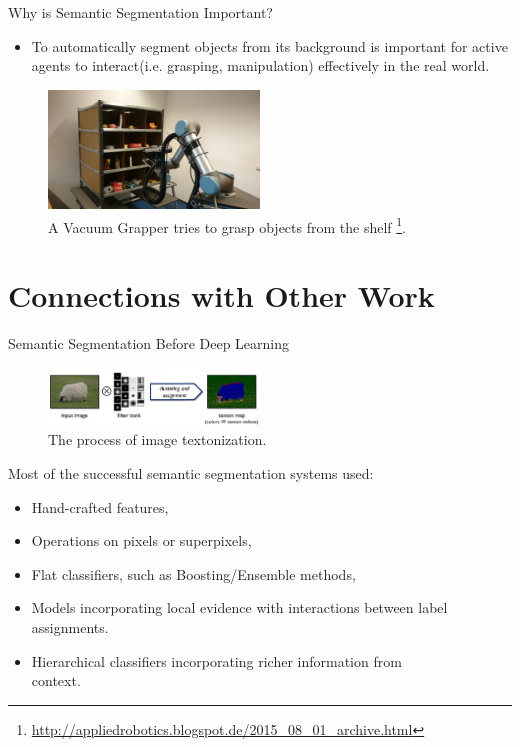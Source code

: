 \documentclass{beamer}
\begin{document}
\begin{frame}{Why is Semantic Segmentation Important?}
\\
\vspace{0.2cm}
\begin{itemize}
	\item
	To automatically segment objects from its background is important for active agents to interact(i.e. grasping, manipulation) effectively in the real world.
\end{itemize}
\begin{figure}
	\centering
	\includegraphics[width=0.5\textwidth]{figure/ss5.jpg}
	\captionsetup{justification=centering}
	\caption{A Vacuum Grapper tries to grasp objects from the shelf \footnote{\url{http://appliedrobotics.blogspot.de/2015\_08\_01\_archive.html}}.}	
\end{figure}

\end{frame}
\section{Connections with Other Work}
\begin{frame}{Semantic Segmentation Before Deep Learning}
\begin{figure}
	\centering
	\includegraphics[width=0.5\textwidth]{figure/ss7.png}
	\captionsetup{justification=centering}
	\caption{The process of image textonization.}	
\end{figure}
	Most of the successful semantic segmentation systems used:
\begin{itemize}
	\item {\color{blue} Hand-crafted} features,
	\item<2-> Operations on {\color{blue}pixels} or {\color{blue}superpixels},
	\item<3-> Flat classifiers, such as {\color{blue} Boosting/Ensemble} methods,
	\item<4-> Models incorporating {\color{blue}local evidence} with interactions between {\color{blue}label assignments}.
	\item<5-> {\color{blue}Hierarchical classifiers} incorporating richer information from\\
	 context.
\end{itemize}
\end{frame}
\end{document}
